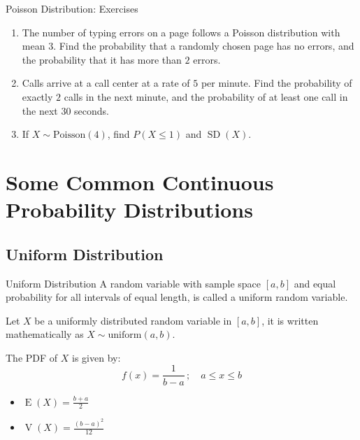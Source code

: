 \documentclass[12pt, aspectratio=169]{beamer}
\DeclareMathOperator{\E}{E}
\DeclareMathOperator{\V}{V}
\begin{document}
	\begin{frame}{Poisson Distribution: Exercises}
		\begin{enumerate}
			\item The number of typing errors on a page follows a Poisson distribution with mean \(3\). Find the probability that a randomly chosen page has no errors, and the probability that it has more than \(2\) errors.
			\item Calls arrive at a call center at a rate of \(5\) per minute. Find the probability of exactly \(2\) calls in the next minute, and the probability of at least one call in the next \(30\) seconds.
			\item If \(X \sim \mathrm{Poisson}(4)\), find \(P(X \leqslant 1)\) and \(\operatorname{SD}(X)\).
		\end{enumerate}
	\end{frame}


		


	\section{Some Common Continuous Probability Distributions}

	\subsection{Uniform Distribution}

	\begin{frame}{Uniform Distribution}
		A random variable with sample space \([a,b]\) and equal probability for all intervals of equal length, is called a uniform random variable.

		\vspace{0.5em}

		Let \(X\) be a uniformly distributed random variable in \([a, b]\), it is written mathematically as \(X \sim \mathrm{uniform}(a, b)\).

		\vspace{0.5em}
		
		The PDF of \(X\) is given by:
		\[
			f(x) = \frac{1}{b-a} \, ; \quad a \leqslant x \leqslant b
		\]

		\begin{itemize}
			\item \(\E(X) = \frac{b+a}{2}\)
			\item \(\V(X) = \frac{(b-a)^2}{12}\)
		\end{itemize}
	\end{frame}
\end{document}
